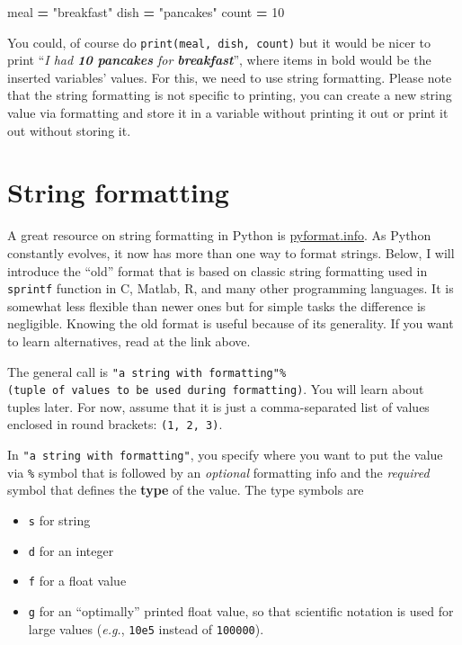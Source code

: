 \documentclass[
]{book}
\newenvironment{Shaded}{\begin{snugshade}}{\end{snugshade}}
\newcommand{\DecValTok}[1]{\textcolor[rgb]{0.00,0.00,0.81}{#1}}
\newcommand{\NormalTok}[1]{#1}
\newcommand{\OperatorTok}[1]{\textcolor[rgb]{0.81,0.36,0.00}{\textbf{#1}}}
\newcommand{\StringTok}[1]{\textcolor[rgb]{0.31,0.60,0.02}{#1}}
\providecommand{\tightlist}{%
  \setlength{\itemsep}{0pt}\setlength{\parskip}{0pt}}
\begin{document}
\begin{Shaded}
\begin{Highlighting}[]
\NormalTok{meal }\OperatorTok{=} \StringTok{"breakfast"}
\NormalTok{dish }\OperatorTok{=} \StringTok{"pancakes"}
\NormalTok{count }\OperatorTok{=} \DecValTok{10}
\end{Highlighting}
\end{Shaded}

You could, of course do \texttt{print(meal,\ dish,\ count)} but it would be nicer to print ``\emph{I had \textbf{10 pancakes} for \textbf{breakfast}}'', where items in bold would be the inserted variables' values. For this, we need to use string formatting. Please note that the string formatting is not specific to printing, you can create a new string value via formatting and store it in a variable without printing it out or print it out without storing it.

\hypertarget{string-formatting}{%
\section{String formatting}\label{string-formatting}}

A great resource on string formatting in Python is \href{https://pyformat.info/}{pyformat.info}. As Python constantly evolves, it now has more than one way to format strings. Below, I will introduce the ``old'' format that is based on classic string formatting used in \texttt{sprintf} function in C, Matlab, R, and many other programming languages. It is somewhat less flexible than newer ones but for simple tasks the difference is negligible. Knowing the old format is useful because of its generality. If you want to learn alternatives, read at the link above.

The general call is \texttt{"a\ string\ with\ formatting"\%(tuple\ of\ values\ to\ be\ used\ during\ formatting)}. You will learn about tuples later. For now, assume that it is just a comma-separated list of values enclosed in round brackets: \texttt{(1,\ 2,\ 3)}.

In \texttt{"a\ string\ with\ formatting"}, you specify where you want to put the value via \texttt{\%} symbol that is followed by an \emph{optional} formatting info and the \emph{required} symbol that defines the \textbf{type} of the value. The type symbols are

\begin{itemize}
\tightlist
\item
  \texttt{s} for string
\item
  \texttt{d} for an integer
\item
  \texttt{f} for a float value
\item
  \texttt{g} for an ``optimally'' printed float value, so that scientific notation is used for large values (\emph{e.g.}, \texttt{10e5} instead of \texttt{100000}).
\end{itemize}
\end{document}

